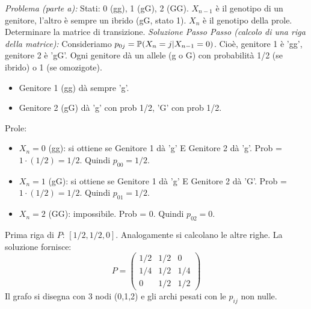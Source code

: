 \documentclass[12pt,a4paper]{article}
\begin{document}
\begin{example}
\begin{example}
\textit{Problema (parte a):} Stati: 0 (gg), 1 (gG), 2 (GG). $X_{n-1}$ è il genotipo di un genitore, l'altro è sempre un ibrido (gG, stato 1). $X_n$ è il genotipo della prole. Determinare la matrice di transizione.
\textit{Soluzione Passo Passo (calcolo di una riga della matrice):}
Consideriamo $p_{0j} = \mathbb{P}(X_n=j | X_{n-1}=0)$. Cioè, genitore 1 è 'gg', genitore 2 è 'gG'.
Ogni genitore dà un allele (g o G) con probabilità 1/2 (se ibrido) o 1 (se omozigote).
\begin{itemize}
    \item Genitore 1 (gg) dà sempre 'g'.
    \item Genitore 2 (gG) dà 'g' con prob 1/2, 'G' con prob 1/2.
\end{itemize}
Prole:
\begin{itemize}
    \item $X_n=0$ (gg): si ottiene se Genitore 1 dà 'g' E Genitore 2 dà 'g'. Prob = $1 \cdot (1/2) = 1/2$. Quindi $p_{00}=1/2$.
    \item $X_n=1$ (gG): si ottiene se Genitore 1 dà 'g' E Genitore 2 dà 'G'. Prob = $1 \cdot (1/2) = 1/2$. Quindi $p_{01}=1/2$.
    \item $X_n=2$ (GG): impossibile. Prob = 0. Quindi $p_{02}=0$.
\end{itemize}
Prima riga di $P$: $[1/2, 1/2, 0]$.
Analogamente si calcolano le altre righe. La soluzione fornisce:
\[ P = \begin{pmatrix} 1/2 & 1/2 & 0 \\ 1/4 & 1/2 & 1/4 \\ 0 & 1/2 & 1/2 \end{pmatrix} \]
Il grafo si disegna con 3 nodi (0,1,2) e gli archi pesati con le $p_{ij}$ non nulle.
\end{example}


\end{example}
\end{document}
